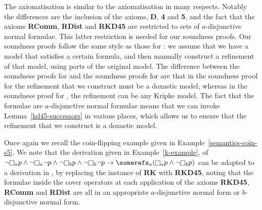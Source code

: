 The axiomatisation \axiomKDF{} is similar to the axiomatisation \axiomKF{} in
many respects. Notably the differences are the inclusion of the \axiomKD{}
axioms, {\bf D}, {\bf 4} and {\bf 5}, and the fact that the axioms {\bf RComm},
{\bf RDist} and {\bf RKD45} are restricted to sets of $a$-disjunctive normal
formulae. This latter restriction is needed for our soundness proofs. Our
soundness proofs follow the same style as those for \axiomKF{}: we assume that
we have a model that satisfies a certain formula, and then manually construct a
refinement of that model, using parts of the original model. The difference
between the soundness proofs for \axiomKF{} and the soundness proofs for
\axiomKDF{} are that in the soundness proof for \axiomKDF{} the refinement that
we construct must be a doxastic model, whereas in the soundness proof for
\axiomKF{}, the refinement can be any Kripke model.  The fact that the formulae
are $a$-disjunctive normal formulae means that we can invoke
Lemma~\ref{kd45-successors} in various places, which allows us to ensure that
the refinement that we construct is a doxastic model.

\begin{example}
Once again we recall the coin-flipping example given in
Example~\ref{semantics-coin-s5}.  We note that the derivation given in
Example~\ref{k-example}, of $\neg \knows_a p \land \neg \knows_a \neg p \land
\neg \knows_b p \land \neg \knows_b \neg p \implies \somerefs_a (\knows_a p
\land \neg \knows_b p)$ can be adapted to a derivation in \axiomKDF{}, by
replacing the instance of {\bf RK} with {\bf RKD45}, noting that the formulae
inside the cover operators at each application of the axioms {\bf RKD45}, {\bf
RComm} and {\bf RDist} are all in an appropriate $a$-disjunctive normal form or
$b$-disjunctive normal form.
\end{example}


